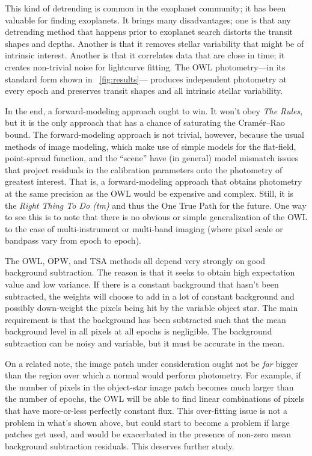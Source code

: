 \documentclass[12pt, letterpaper, preprint]{aastex}
\begin{document}
This kind of detrending is common in the exoplanet community;
  it has been valuable for finding exoplanets.
It brings many disadvantages;
  one is that any detrending method that happens prior to exoplanet search
  distorts the transit shapes and depths.
Another is that it removes stellar variability that might be of intrinsic interest.
Another is that it correlates data that are close in time;
  it creates non-trivial noise for lightcurve fitting.
The OWL photometry---in its standard form shown in \figurename~\ref{fig:results}---%
  produces independent photometry at every epoch
  and preserves transit shapes and all intrinsic stellar variability.

In the end, a forward-modeling approach ought to win.
It won't obey \emph{The Rules}, but it is the only approach that has a chance
  of saturating the Cram\'er--Rao bound.
The forward-modeling approach is not trivial, however,
  because the usual methods of image modeling,
  which make use of simple models for the flat-field, point-spread function,
  and the ``scene''
  have (in general) model mismatch issues that project residuals
  in the calibration parameters onto the photometry of greatest interest.
That is, a forward-modeling approach that obtains photometry at the same
  precision as the OWL would be expensive and complex.
Still, it is the \emph{Right Thing To Do (tm)} and thus the One True Path for the future.
One way to see this is to note that there is no obvious or simple generalization of the OWL
  to the case of multi-instrument or multi-band imaging
  (where pixel scale or bandpass vary from epoch to epoch).

The OWL, OPW, and TSA methods all depend very strongly on good background subtraction.
The reason is that it seeks to obtain high expectation value and low variance.
If there is a constant background that hasn't been subtracted,
  the weights will choose to add in a lot of constant background
  and possibly down-weight the pixels being hit by the variable object star.
The main requirement is that the background has been subtracted such
  that the mean background level in all pixels at all epochs is negligible.
The background subtraction can be noisy and variable,
  but it must be accurate in the mean.

On a related note, the image patch under consideration ought not be \emph{far}
  bigger than the region over which a normal would perform photometry.
For example, if the number of pixels in the object-star image patch becomes
  much larger than the number of epochs,
  the OWL will be able to find linear combinations of pixels that have
  more-or-less perfectly constant flux.
This over-fitting issue is not a problem in what's shown above,
  but could start to become a problem if large patches get used,
  and would be exacerbated in the presence of non-zero mean background subtraction residuals.
This deserves further study.
\end{document}
